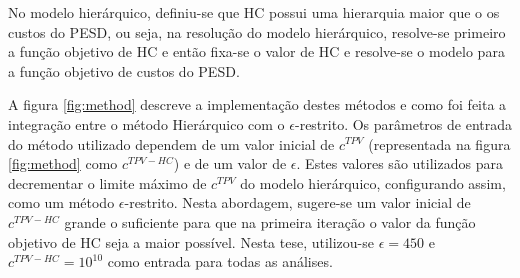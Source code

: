 No modelo hierárquico, definiu-se que \ac{HC} possui uma hierarquia maior que o os custos do \ac{PESD}, ou seja, na resolução do modelo hierárquico, resolve-se primeiro a função objetivo de \ac{HC} e então fixa-se o valor de \ac{HC} e resolve-se o modelo para a função objetivo de custos do \ac{PESD}.

A figura \ref{fig:method} descreve a implementação destes métodos e como foi feita a integração entre o método Hierárquico com o $\epsilon$-restrito. Os parâmetros de entrada do método utilizado dependem de um valor inicial de $c^{TPV}$ (representada na figura \ref{fig:method} como $c^{TPV - HC}$) e de um valor de $\epsilon$. Estes valores são utilizados para decrementar o limite máximo de $c^{TPV}$ do modelo hierárquico, configurando assim, como um método $\epsilon$-restrito. Nesta abordagem, sugere-se um valor inicial de $c^{TPV - HC}$ grande o suficiente para que na primeira iteração o valor da função objetivo de \ac{HC} seja a maior possível. Nesta tese, utilizou-se $\epsilon = 450$ e $c^{TPV - HC} = 10^{10}$ como entrada para todas as análises.

